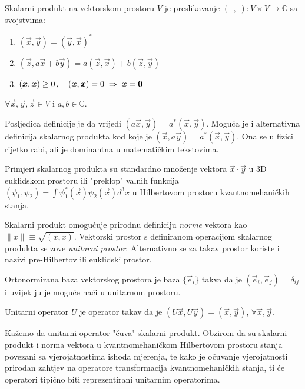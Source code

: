 \begin{definicija}
Skalarni produkt na vektorskom prostoru $V$ je preslikavanje
$(\,\;,\;):V\times V \to \mathbb{C}$ sa svojstvima:
\begin{enumerate}
\item $(\vec{x}, \vec{y}) = (\vec{y}, \vec{x})^*$
\item $(\vec{z}, a \vec{x} +b \vec{y})= a(\vec{z},\vec{x})+b(\vec{z},\vec{y})$
\item $(\vec{x}, \vec{x})\ge 0\,, \quad (\vec{x}, \vec{x})=0 \imp \vec{x}=\vec{0}$
\end{enumerate}
$\forall \vec{x}, \vec{y}, \vec{z} \in V$ i $a,b \in\mathbb{C}$.
\label{def:skalarniprodukt}
\end{definicija}

Posljedica definicije je da vrijedi $(a \vec{x}, \vec{y})= a^* (\vec{x}, \vec{y})$.
Moguća je i alternativna definicija skalarnog produkta kod koje je
$(\vec{x}, a \vec{y}) = a^* (\vec{x}, \vec{y})$. Ona se u fizici
rijetko rabi, ali je dominantna u matematičkim tekstovima.

Primjeri skalarnog produkta su standardno množenje
vektora $\vec{x}\cdot \vec{y}$ u 3D euklidskom prostoru ili "preklop"
valnih funkcija
$(\psi_1, \psi_2) = \int \psi_{1}^{*}(\vec{x}) \psi_{2}(\vec{x}) d^3 x$
u Hilbertovom prostoru kvantnomehaničkih stanja.

Skalarni produkt omogućuje prirodnu definiciju \emph{norme} vektora
  kao $\lVert x\rVert \equiv \sqrt{(x, x)}$.
Vektorski prostor s definiranom operacijom skalarnog produkta se
 zove \emph{unitarni prostor}. Alternativno se za takav prostor
 koriste i nazivi pre-Hilbertov ili  euklidski prostor.

Ortonormirana baza vektorskog prostora je baza $\{\vec{e}_i\}$
takva da je $(\vec{e}_i, \vec{e}_j)=\delta_{ij}$ i uvijek ju je moguće
naći u unitarnom prostoru.

\begin{definicija}
Unitarni operator $U$ je operator takav da je $(U\vec{x}, U\vec{y})
=(\vec{x}, \vec{y})$, $\forall \vec{x}, \vec{y}$. 
\end{definicija}

Kažemo da
unitarni operator "čuva" skalarni produkt. Obzirom da su skalarni
produkt i norma vektora u kvantnomehaničkom Hilbertovom prostoru
stanja povezani sa vjerojatnostima ishoda mjerenja, te kako je očuvanje vjerojatnosti
prirodan zahtjev na operatore transformacija kvantnomehaničkih
stanja, ti će operatori tipično biti reprezentirani unitarnim
operatorima.

